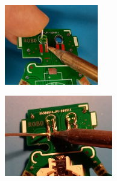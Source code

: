 \documentclass[a4paper]{article}
\begin{document}
\ \\
\begin{minipage}[t]{0.33\textwidth}
  \centering
  \includegraphics[height=3.5cm]{../pictures/LED7.jpg}
  \label{img:LED7}
  \end{minipage}
\begin{minipage}[t]{0.33\textwidth}
  \centering
  \includegraphics[height=3.5cm]{../pictures/LED8.jpg}
  \label{img:LED8}
\end{minipage}
\end{document}
